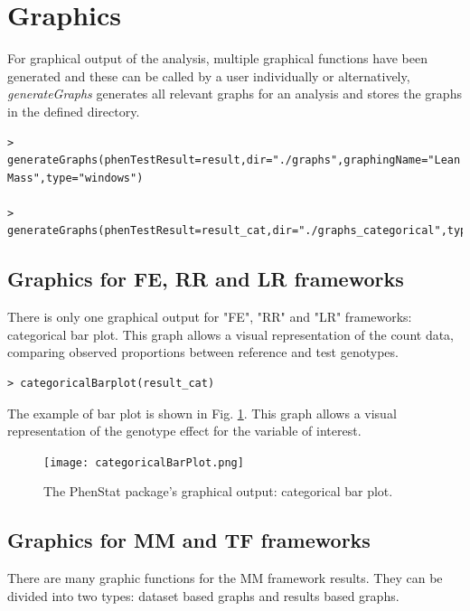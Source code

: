 \documentclass[12pt,a4paper]{article}
\begin{document}
\section{Graphics}
For graphical output of the analysis, multiple graphical functions have been generated and these can be called by a user individually or alternatively, 
\textit{generateGraphs} generates all relevant graphs for an analysis and stores the graphs in the defined directory. 


\begingroup
    \fontsize{8pt}{12pt}\selectfont
\begin{verbatim}
> generateGraphs(phenTestResult=result,dir="./graphs",graphingName="Lean Mass",type="windows")

> generateGraphs(phenTestResult=result_cat,dir="./graphs_categorical",type="windows")
\end{verbatim}
\endgroup 

\subsection{Graphics for FE, RR and LR frameworks}
There is only one graphical output for "FE", "RR" and "LR" frameworks: categorical bar plot. This graph allows a visual representation of the count data, comparing observed proportions between reference and test genotypes.  


\begingroup
    \fontsize{8pt}{12pt}\selectfont
\begin{verbatim}
> categoricalBarplot(result_cat)
\end{verbatim}
\endgroup 

The example of bar plot is shown in Fig. \ref{fig:06}. This graph allows a visual representation of the genotype effect for the variable of interest.
\begin{figure}[!htpb]%
\centerline{\texttt{[image: categoricalBarPlot.png]}}
\caption{The PhenStat package's graphical output: categorical bar plot.}\label{fig:06}
\end{figure}

\subsection{Graphics for MM and TF frameworks}
There are many graphic functions for the MM framework results. They can be divided into two types: dataset based graphs and results based graphs.
\end{document}
